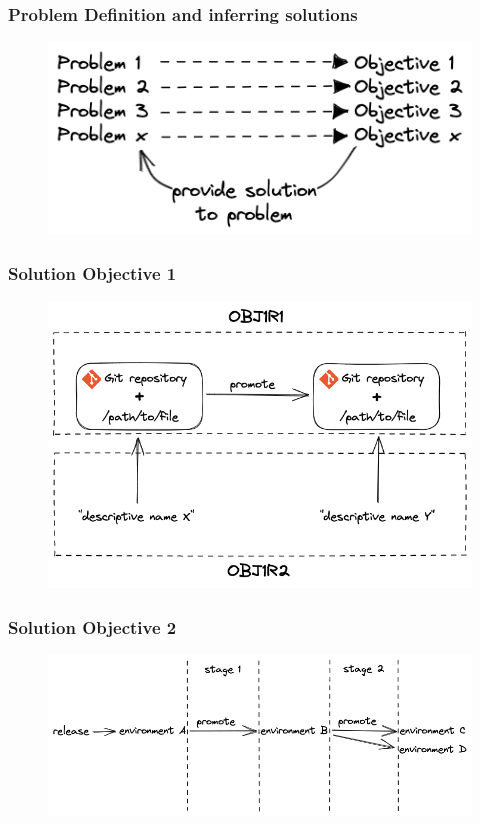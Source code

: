 \documentclass{beamer}
\begin{document}
\begin{frame}
	\frametitle{Problem Definition and inferring solutions}
\begin{figure}[h]
	\centering
	\includegraphics[width=0.65\linewidth]{assets/from-problem-to-objective-visualized.png}
	\label{fig:from-problem-to-objective-visualized}	
\end{figure}
\end{frame}
\begin{frame}
	\frametitle{Solution Objective 1}
	\begin{figure}[h]
		\centering
		\includegraphics[width=1.0\linewidth]{assets/OBJ1R1-and-OBJ1R2.png}
		\label{fig:OBJ1R1-and-OBJ1R2}	
	\end{figure}
\end{frame}
\begin{frame}
	\frametitle{Solution Objective 2}
	\begin{figure}[h]
		\centering
		\includegraphics[width=1.0\linewidth]{assets/OBJ2R1.png}
		\label{fig:OBJ2R1}	
	\end{figure}
\end{frame}
\end{document}
